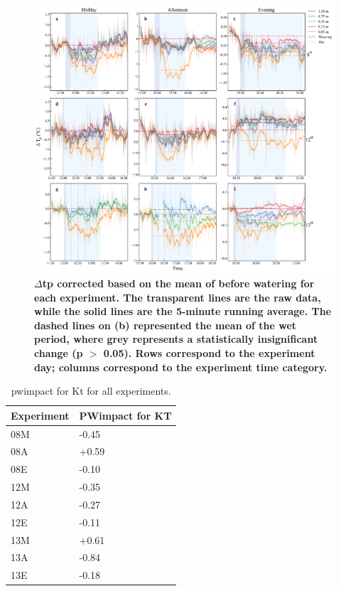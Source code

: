 \documentclass[final,3p,times,authoryear]{elsarticle}
\begin{document}
\begin{figure}
\centering
\includegraphics[trim={0 0 0 0},clip,scale=1.0]{pict043.png}
\caption{\bf $\Delta$\gls{tp} corrected based on the mean of before watering for each experiment. The transparent lines are the raw data, while the solid lines are the 5-minute running average. The dashed lines on (b) represented the mean of the wet period, where grey represents a statistically insignificant change (\gls{p} $>$ 0.05). Rows correspond to the experiment day; columns correspond to the experiment time category.}
 \label{fig:7.14}
\end{figure}



\begin{table}[!ht]\caption{\gls{pwimpact} for \gls{Kt} for all experiments.}
    \centering
    \begin{tabular}{|l|l|}
    \hline
        Experiment & PWimpact for KT \\ \hline
        08M & -0.45 \\ \hline
        08A & +0.59 \\ \hline
        08E & -0.10 \\ \hline
        12M & -0.35 \\ \hline
        12A & -0.27 \\ \hline
        12E & -0.11 \\ \hline
        13M & +0.61 \\ \hline
        13A & -0.84 \\ \hline
        13E & -0.18 \\ \hline
    \end{tabular}\label{table:7.4}
\end{table}
\end{document}
